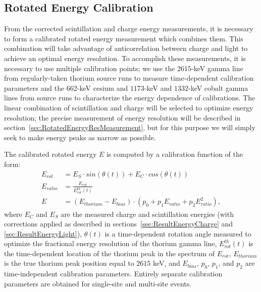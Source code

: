 \subsection{Rotated Energy Calibration}\label{sec:RotatedEnergyCalibration}

From the corrected scintillation and charge energy measurements, it is necessary to form a calibrated rotated energy measurement which combines them.  This combination will take advantage of anticorrelation between charge and light to achieve an optimal energy resolution.  To accomplish these measurements, it is necessary to use multiple calibration points; we use the $2615$-keV gamma line from regularly-taken thorium source runs to measure time-dependent calibration parameters and the 662-keV cesium and $1173$-keV and $1332$-keV cobalt gamma lines from source runs to characterize the energy dependence of calibrations.  The linear combination of scintillation and charge will be selected to optimize energy resolution; the precise measurement of energy resolution will be described in section~\ref{sec:RotatedEnergyResMeasurement}, but for this purpose we will simply seek to make energy peaks as narrow as possible.

The calibrated rotated energy $E$ is computed by a calibration function of the form:
\begin{subequations}\label{eqn:EnergyCalibrationParametrization}\begin{align}
E_{rot} &= E_S \cdot sin(\theta(t)) + E_C \cdot cos(\theta(t))\\
E_{ratio} &= \frac{E_{rot}}{E^{th}_{rot}(t)}\\
E &= \left( E_{thorium} - E_{bias} \right) \cdot \left( p_0 + p_1 E_{ratio} + p_2 E_{ratio}^2\right),
\end{align}\end{subequations}
where $E_C$ and $E_S$ are the measured charge and scintillation energies (with corrections applied as described in sections~\ref{sec:ResultEnergyCharge} and \ref{sec:ResultEnergyLight}), $\theta(t)$ is a time-dependent rotation angle measured to optimize the fractional energy resolution of the thorium gamma line, $E^{th}_{rot}(t)$ is the time-dependent location of the thorium peak in the spectrum of $E_{rot}$, $E_{thorium}$ is the true thorium peak position equal to $2615$ keV, and $E_{bias}$, $p_0$, $p_1$, and $p_2$ are time-independent calibration parameters.  Entirely separate calibration parameters are obtained for single-site and multi-site events.

